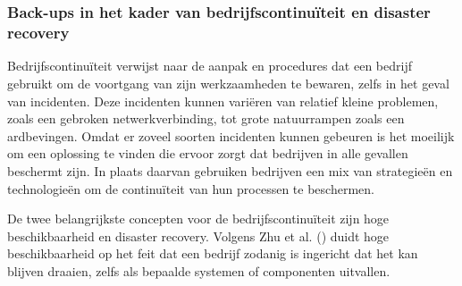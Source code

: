 \chapter{}%
\label{ch:stand-van-zaken}






\subsection{Back-ups in het kader van bedrijfscontinuïteit en disaster recovery}
Bedrijfscontinuïteit verwijst naar de aanpak en procedures dat een bedrijf gebruikt om de voortgang van zijn werkzaamheden te bewaren, zelfs in het geval van incidenten. Deze incidenten kunnen variëren van relatief kleine problemen, zoals een gebroken netwerkverbinding, tot grote natuurrampen zoals een ardbevingen. Omdat er zoveel soorten incidenten kunnen gebeuren is het moeilijk om een oplossing te vinden die ervoor zorgt dat bedrijven in alle gevallen beschermt zijn. In plaats daarvan gebruiken bedrijven een mix van strategieën en technologieën om de continuïteit van hun processen te beschermen. 

De twee belangrijkste concepten voor de bedrijfscontinuïteit zijn hoge beschikbaarheid en disaster recovery. Volgens Zhu et al. (\citeyear{Zhu2015}) duidt hoge beschikbaarheid op het feit dat een bedrijf zodanig is ingericht dat het kan blijven draaien, zelfs als bepaalde systemen of componenten uitvallen.



